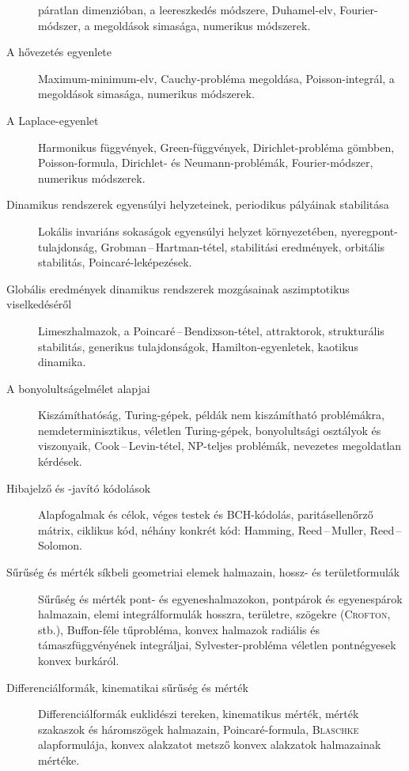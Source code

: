 \documentclass[%
	DIV=15,appendixprefix]{scrreprt}
\theoremstyle{definition}
\theoremstyle{remark}
\begin{document}
\begin{description}
	páratlan dimenzióban, a leereszkedés módszere, Duhamel-elv, Fourier-módszer, a megoldások
	simasága, numerikus módszerek.
%
	\item[A hővezetés egyenlete] Maximum-minimum-elv, Cauchy-probléma megoldása, Poisson-integrál,
	a megoldások simasága, numerikus módszerek.
%
	\item[A Laplace-egyenlet] Harmonikus függvények, Green-függvények, Dirichlet-probléma gömbben,
	Po\-is\-son-formula, Dirichlet- és Neumann-problémák, Fourier-módszer, numerikus módszerek.
%
	\item[Dinamikus rendszerek egyensúlyi helyzeteinek, periodikus pályáinak stabilitása] Lokális
	invariáns sokaságok egyensúlyi helyzet környezetében, nyeregpont-tulajdonság,
	Grobman\,--\,Hartman-tétel, stabilitási eredmények, orbitális stabilitás, Poincaré-leképezések.
%
	\item[Globális eredmények dinamikus rendszerek mozgásainak aszimptotikus viselkedéséről]
	Li\-mesz\-hal\-ma\-zok, a Poincaré\,--\,Bendixson-tétel, attraktorok, strukturális stabilitás, generikus
	tulajdonságok, Hamilton-egyenletek, kaotikus dinamika.
%
	\item[A bonyolultságelmélet alapjai] Kiszámíthatóság, Turing-gépek, példák nem kiszámítható
	problémákra, nemdeterminisztikus, véletlen Turing-gépek, bonyolultsági osztályok és viszonyaik,
	Cook\,--\,Levin-tétel, NP-teljes problémák, nevezetes megoldatlan kérdések.
%
	\item[Hibajelző és -javító kódolások] Alapfogalmak és célok, véges testek és BCH-kódolás,
	paritásellenőrző mátrix, ciklikus kód, néhány konkrét kód: Hamming, Reed\,--\,Muller,
	Reed\,--\,Solomon.
%
	\item[Sűrűség és mérték síkbeli geometriai elemek halmazain, hossz- és területformulák] Sűrűség
	és mérték pont- és egyeneshalmazokon, pontpárok és egyenespárok halmazain, elemi
	integrálformulák hosszra, területre, szögekre (\textsc{Crofton}, stb.), Buffon-féle tűprobléma,
	konvex halmazok radiális és támaszfüggvényének integráljai, Sylvester-probléma véletlen
	pontnégyesek konvex burkáról.
%
	\item[Differenciálformák, kinematikai sűrűség és mérték] Differenciálformák euklidészi tereken,
	kinematikus mérték, mérték szakaszok és háromszögek halmazain, Poincaré-formula,
	\textsc{Blaschke} alapformulája, konvex alakzatot metsző konvex alakzatok halmazainak mértéke.
\end{description}
%


\nocite{*}
\end{document}

